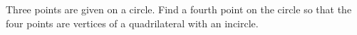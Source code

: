 Three points are given on a circle. Find a fourth point on the circle so that the four points are vertices of a quadrilateral with an incircle.
